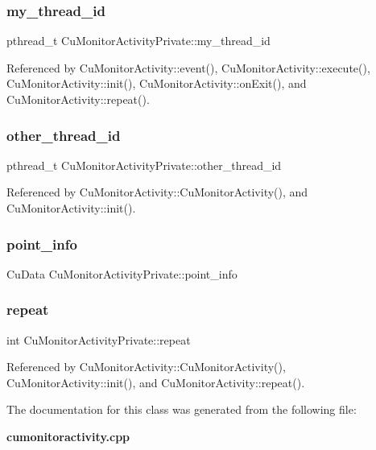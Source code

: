 \subsubsection{my\+\_\+thread\+\_\+id}
{\footnotesize\ttfamily pthread\+\_\+t Cu\+Monitor\+Activity\+Private\+::my\+\_\+thread\+\_\+id}



Referenced by Cu\+Monitor\+Activity\+::event(), Cu\+Monitor\+Activity\+::execute(), Cu\+Monitor\+Activity\+::init(), Cu\+Monitor\+Activity\+::on\+Exit(), and Cu\+Monitor\+Activity\+::repeat().

\mbox{\label{classCuMonitorActivityPrivate_ad8d937086afaccbb9b686ffeea9969a5}} 
\subsubsection{other\+\_\+thread\+\_\+id}
{\footnotesize\ttfamily pthread\+\_\+t Cu\+Monitor\+Activity\+Private\+::other\+\_\+thread\+\_\+id}



Referenced by Cu\+Monitor\+Activity\+::\+Cu\+Monitor\+Activity(), and Cu\+Monitor\+Activity\+::init().

\mbox{\label{classCuMonitorActivityPrivate_aa23d8c915a8d8d9dd39c0ee71f2ac2a5}} 
\subsubsection{point\+\_\+info}
{\footnotesize\ttfamily Cu\+Data Cu\+Monitor\+Activity\+Private\+::point\+\_\+info}

\mbox{\label{classCuMonitorActivityPrivate_a0779e4f5ee7ef2aa56d5a1a9bc020f56}} 
\subsubsection{repeat}
{\footnotesize\ttfamily int Cu\+Monitor\+Activity\+Private\+::repeat}



Referenced by Cu\+Monitor\+Activity\+::\+Cu\+Monitor\+Activity(), Cu\+Monitor\+Activity\+::init(), and Cu\+Monitor\+Activity\+::repeat().



The documentation for this class was generated from the following file\+:\begin{DoxyCompactItemize}
\item 
\textbf{ cumonitoractivity.\+cpp}\end{DoxyCompactItemize}
